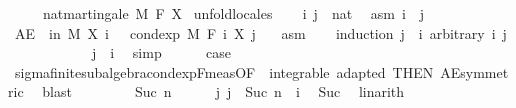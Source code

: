 \begin{isabellebody}
\ \ \ \ \ {\isachardoublequoteopen}nat{\isacharunderscore}{\kern0pt}martingale\ M\ F\ X{\isachardoublequoteclose}\isanewline
%
\isadelimproof
%
\endisadelimproof
%
\isatagproof
{}\isamarkupfalse%
\ {\isacharparenleft}{\kern0pt}unfold{\isacharunderscore}{\kern0pt}locales{\isacharparenright}{\kern0pt}\isanewline
\ \ \isamarkupfalse%
\ i\ j\ {\isacharcolon}{\kern0pt}{\isacharcolon}{\kern0pt}\ nat\ \isamarkupfalse%
\ asm{\isacharcolon}{\kern0pt}\ {\isachardoublequoteopen}i\ {\isasymle}\ j{\isachardoublequoteclose}\isanewline
\ \ \isamarkupfalse%
\ {\isachardoublequoteopen}AE\ {\isasymxi}\ in\ M{\isachardot}{\kern0pt}\ X\ i\ {\isasymxi}\ {\isacharequal}{\kern0pt}\ cond{\isacharunderscore}{\kern0pt}exp\ M\ {\isacharparenleft}{\kern0pt}F\ i{\isacharparenright}{\kern0pt}\ {\isacharparenleft}{\kern0pt}X\ j{\isacharparenright}{\kern0pt}\ {\isasymxi}{\isachardoublequoteclose}\ \isamarkupfalse%
\ asm\isanewline
\ \ \isamarkupfalse%
\ {\isacharparenleft}{\kern0pt}induction\ {\isachardoublequoteopen}j\ {\isacharminus}{\kern0pt}\ i{\isachardoublequoteclose}\ arbitrary{\isacharcolon}{\kern0pt}\ i\ j{\isacharparenright}{\kern0pt}\isanewline
\ \ \ \ \isamarkupfalse%
\ {}\isanewline
\ \ \ \ \isamarkupfalse%
\ {\isachardoublequoteopen}j\ {\isacharequal}{\kern0pt}\ i{\isachardoublequoteclose}\ \isamarkupfalse%
\ simp\isanewline
\ \ \ \ \isamarkupfalse%
\ {\isacharquery}{\kern0pt}case\ \isamarkupfalse%
\ sigma{\isacharunderscore}{\kern0pt}finite{\isacharunderscore}{\kern0pt}subalgebra{\isachardot}{\kern0pt}cond{\isacharunderscore}{\kern0pt}exp{\isacharunderscore}{\kern0pt}F{\isacharunderscore}{\kern0pt}meas{\isacharbrackleft}{\kern0pt}OF\ {\isacharunderscore}{\kern0pt}\ integrable\ adapted{\isacharcomma}{\kern0pt}\ THEN\ AE{\isacharunderscore}{\kern0pt}symmetric{\isacharbrackright}{\kern0pt}\ \isamarkupfalse%
\ blast\isanewline
\ \ \isamarkupfalse%
\isanewline
\ \ \ \ \isamarkupfalse%
\ {\isacharparenleft}{\kern0pt}Suc\ n{\isacharparenright}{\kern0pt}\isanewline
\ \ \ \ \isamarkupfalse%
\ j{\isacharcolon}{\kern0pt}\ {\isachardoublequoteopen}j\ {\isacharequal}{\kern0pt}\ Suc\ {\isacharparenleft}{\kern0pt}n\ {\isacharplus}{\kern0pt}\ i{\isacharparenright}{\kern0pt}{\isachardoublequoteclose}\ \isamarkupfalse%
\ Suc\ \isamarkupfalse%
\ linarith\isanewline
\ \ \ \ \isamarkupfalse%

\end{isabellebody}
